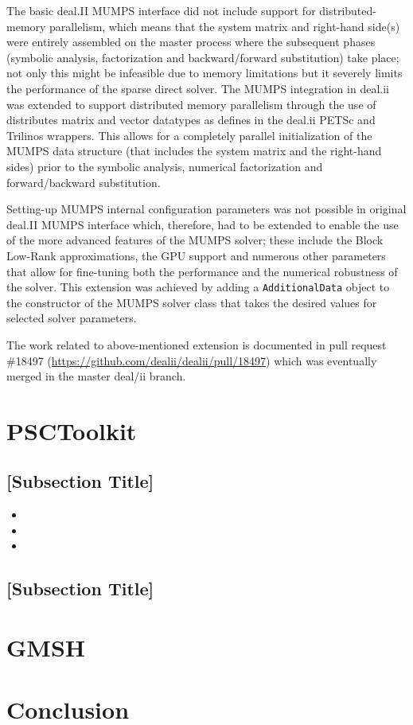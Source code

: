 \documentclass[a4paper,12pt]{article}
\begin{document}
The basic deal.II MUMPS interface did not include support for
distributed-memory parallelism, which means that the system matrix and
right-hand side(s) were entirely assembled on the master process where
the subsequent phases (symbolic analysis, factorization and
backward/forward substitution) take place; not only this might be
infeasible due to memory limitations but it severely limits the
performance of the sparse direct solver. The MUMPS integration in
deal.ii was extended to support distributed memory parallelism through
the use of distributes matrix and vector datatypes as defines in the
deal.ii PETSc and Trilinos wrappers. This allows for a completely
parallel initialization of the MUMPS data structure (that includes the
system matrix and the right-hand sides) prior to the symbolic
analysis, numerical factorization and forward/backward substitution.

Setting-up MUMPS internal configuration parameters was not possible in
original deal.II MUMPS interface which, therefore, had to be
extended to enable the use of the more advanced features of the MUMPS
solver; these include the Block Low-Rank approximations, the GPU
support and numerous other parameters that allow for fine-tuning both
the performance and the numerical robustness of the solver. This
extension was achieved by adding a \texttt{AdditionalData} object
to the constructor of the MUMPS solver class that takes the desired
values for selected solver parameters.

The work related to above-mentioned extension is documented in pull
request \#18497 (\url{https://github.com/dealii/dealii/pull/18497})
which was eventually merged in the master deal/ii branch.


\newpage

\section{PSCToolkit}
\label{sec:section3}

\lipsum[8-9]

\subsection{{[Subsection Title]}}
\begin{itemize}[left=1em, itemsep=0pt, topsep=0pt] 
    \item \lipsum[10][1-2]
    \item \lipsum[10][3-4]
    \item \lipsum[10][5-6]
\end{itemize}

\subsection{{[Subsection Title]}}
\lipsum[11]

\newpage

\section{GMSH}
\label{sec:section4}

\lipsum[12-13]

\newpage 

\section{{Conclusion}} \label{sec:conclusion}

\lipsum[20]

\label{MyLastPage}
\end{document}
